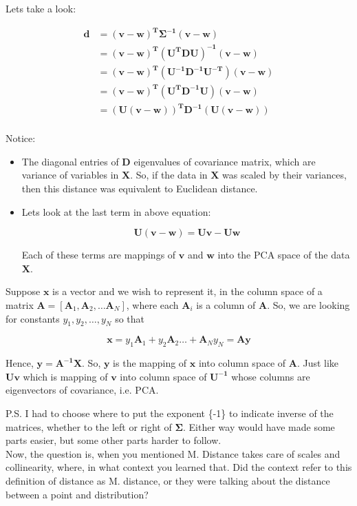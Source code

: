 \documentclass[12pt]{article}
\theoremstyle{plain}
\theoremstyle{definition}
\theoremstyle{definition}
\begin{document}
Lets take a look:

\begin{equation}\label{eq:equivalency}
\begin{aligned}
\mathbf{d} &= \mathbf{(v - w)^T \Sigma^{-1} (v - w)} \\
                 &= \mathbf{(v - w)^T  (U^T D U) ^{-1} (v - w)} \\
                 &= \mathbf{(v - w)^T  (U^{-1} D^{-1} U^{-T}) (v - w)} \\
                 &= \mathbf{(v - w)^T  (U^T D^{-1} U) (v - w)} \\
                 &= \mathbf{(U(v - w))^T  D^{-1} (U (v - w))} \\
\end{aligned}
\end{equation}

Notice:
\begin{itemize}
\item The diagonal entries of $\mathbf{D}$ eigenvalues of covariance matrix,
which are variance of variables in $\mathbf{X}$. So, if the data in $\mathbf{X}$
was scaled by their variances, then this distance was equivalent to Euclidean distance.

\item Lets look at the last term in above equation:

\begin{equation}
\mathbf{ U (v - w)}  = \mathbf{ U v} - \mathbf{ U w}
\end{equation}

Each of these terms are mappings of $\mathbf{v}$ and $\mathbf{w}$
into the PCA space of the data $\mathbf{X}$.
\end{itemize}


Suppose $\mathbf{x}$ is a vector and we wish to represent it, 
in the column space of a matrix $\mathbf{A} = [\mathbf{A}_1, \mathbf{A}_2, \dots \mathbf{A}_N]$,
where each $\mathbf{A}_i$ is a column of $\mathbf{A}$. So, we are looking for constants $y_1, y_2, \dots, y_N$ so that 

\[\mathbf{x} = y_1 \mathbf{A}_1 + y_2 \mathbf{A}_2 \dots + \mathbf{A}_N y_N = \mathbf{Ay} \]

Hence, $\mathbf{y = A^{-1} X}$. So, $\mathbf{y}$ is the mapping of $\mathbf{x}$ into column space of
$\mathbf{A}$. Just like $\mathbf{Uv}$ which is mapping of $\mathbf{v}$ into column space of $\mathbf{U^{-1}}$
whose columns are eigenvectors of covariance, i.e. PCA.

P.S. I had to choose where to put the exponent \{-1\} to indicate inverse of the matrices, 
whether to the left or right of  $\mathbf{\Sigma}$.
Either way would have made some parts easier, but some other parts harder to follow.\\


Now, the question is, when you mentioned M. Distance takes
care of scales and collinearity, where, in what context you learned that.
Did the context refer to this definition of distance as M. distance, 
or they were talking about the distance between a point and distribution?
\end{document}
